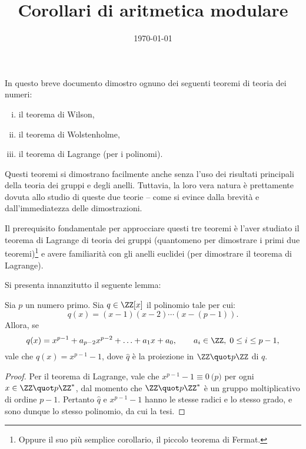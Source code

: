 \documentclass[12pt]{scrartcl}
\begin{document}
	\title{Corollari di aritmetica modulare}
	\date{\today}
	\maketitle
	
	In questo breve documento dimostro ognuno
	dei seguenti teoremi di teoria dei numeri:
	
	\begin{enumerate}[(i)]
		\item il teorema di Wilson,
		\item il teorema di Wolstenholme,
		\item il teorema di Lagrange (per i polinomi).
	\end{enumerate}
	
	Questi teoremi si dimostrano facilmente anche senza l'uso dei risultati
	principali della teoria dei gruppi e degli anelli. Tuttavia, la
	loro vera natura è prettamente dovuta allo studio di queste due
	teorie -- come si evince dalla brevità e dall'immediatezza delle
	dimostrazioni. \bigskip
	
	
	
	Il prerequisito fondamentale per approcciare questi tre teoremi
	è l'aver studiato il teorema di Lagrange di teoria dei gruppi
	(quantomeno per dimostrare i primi due teoremi)\footnote{
		Oppure il suo più semplice corollario, il piccolo teorema di Fermat.
	} e avere familiarità con gli anelli euclidei (per dimostrare
	il teorema di Lagrange). \bigskip
	
	
	Si presenta innanzitutto il seguente lemma:

	\begin{lemma}
		Sia $p$ un numero primo.
		Sia $q \in \ZZ[x]$ il polinomio tale per cui:
		\[
			q(x) = (x-1)(x-2)\cdots(x-(p-1)).
		\]
		Allora, se
		\[
			q(x) = x^{p-1} + a_{p-2} x^{p-2} + \ldots + a_1 x + a_0, \qquad a_i \in \ZZ,\;0 \leq i \leq p-1,
		\]
		vale che $\hat q(x) = x^{p-1} -1$, dove $\hat q$ è la proiezione in $\ZZ \quot p\ZZ$ di $q$.
	\end{lemma}
	
	\begin{proof}
		Per il teorema di Lagrange, vale che
		$x^{p-1} - 1 \equiv 0 \pod p$ per ogni $x \in \ZZ \quot p\ZZ^*$, dal momento che
		$\ZZ \quot p\ZZ^*$ è un gruppo moltiplicativo di ordine $p-1$.
		Pertanto $\hat q$ e $x^{p-1} - 1$ hanno le stesse radici e
		lo stesso grado, e sono dunque lo stesso polinomio, da cui la tesi.
	\end{proof}
	
\end{document}
